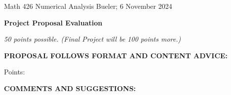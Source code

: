 \documentclass[12pt]{amsart}
\begin{document}
\scriptsize \noindent Math 426 Numerical Analysis \hfill  Bueler; 6 November 2024
\normalsize\bigskip

\thispagestyle{empty}
\noindent\large\centerline{\textbf{Project Proposal Evaluation}} \normalsize

\medskip
\noindent\centerline{\emph{50 points possible.  (Final Project will be 100 points more.)}}

\bigskip

\noindent \textbf{PROPOSAL FOLLOWS FORMAT AND CONTENT ADVICE:}

\vspace{40mm}

\hfill Points: \quad \underline{\phantom{lkjdfas sadlkj}}

\bigskip

\noindent \textbf{COMMENTS AND SUGGESTIONS:}
\vfill
\end{document}

